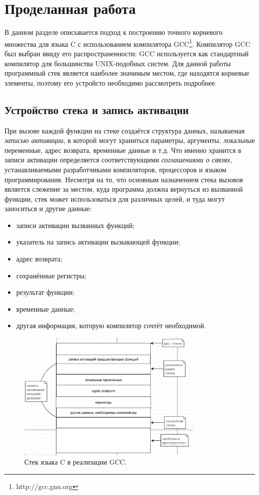 \section{Проделанная работа}

В данном разделе описывается подход к построению точного корневого множества для языка C с использованием компилятора GCC\footnote{http://gcc.gnu.org}. 
Компилятор GCC был выбран ввиду его распространенности: GCC используется как стандартный компилятор для большинства UNIX-подобных систем. 
Для данной работы программный стек является наиболее значимым местом, где находятся корневые элементы, поэтому его устройсто необходимо рассмотреть подробнее.

\subsection{Устройство стека и запись активации}
При вызове каждой функции на стеке создаётся структура данных, называемая \emph{записью активации}, в которой могут храниться параметры, аргументы, 
локальные переменные, адрес возврата, временные данные и т.д. Что именно хранится в записи активации определяется соответствующими \emph{соглашениями о связях}, 
устанавливаемыми разработчиками компиляторов, процессоров и языком программирования. Несмотря на то, что основным назначением стека вызовов является слежение за
местом, куда программа должна вернуться из вызванной функции, стек может использоваться для различных целей, и туда могут заноситься и другие данные:

\begin{itemize}
\item записи активации вызванных функций;
\item указатель на запись активации вызывающей функции;
\item адрес возврата;
\item сохранённые регистры;
\item результат функции;
\item временные данные;
\item другая информация, которую компилятор сочтёт необходимой.
\end{itemize}

\begin{figure}[h]
\centering
\includegraphics[width=0.8\textwidth]{Berezun/StackFrameC.png}
\caption{Стек языка C в реализации GCC.}
\end{figure}

